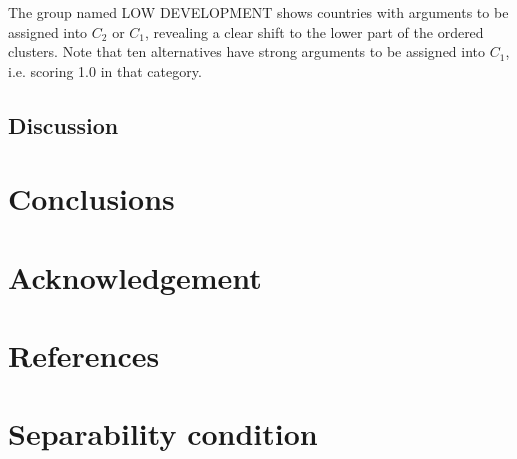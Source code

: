 \documentclass[]{elsarticle}
\theoremstyle{definition}
\begin{document}
The group named LOW DEVELOPMENT shows countries with arguments to be assigned into $C_2$ or $C_1$, revealing a clear shift to the lower part of the ordered clusters. Note that ten alternatives have strong arguments to be assigned into $C_1$, i.e. scoring 1.0 in that category.




\subsection{Discussion}




\section{Conclusions}\label{conclusions}
  


     
\section*{Acknowledgement}

          
\section*{References}







\appendix
\section{Separability condition}\label{sepcondition}
\end{document}
